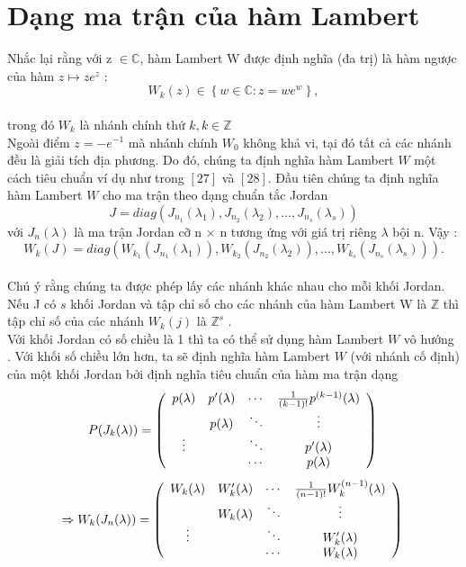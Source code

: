 \section{Dạng ma trận của hàm Lambert}
Nhắc lại rằng với z $\in \mathbb{C}$, hàm Lambert W được định nghĩa (đa trị) là hàm ngược của hàm $z \mapsto ze^{z}$ :
$$ W_k(z) \in \left\{w \in \mathbb{C} : z = we^{w}\right\}, $$ \\
trong đó $W_{k}$ là nhánh chính thứ $k, k \in \mathbb{Z}$ \\
Ngoài điểm $ z = -e^{-1}$ mà nhánh chính $W_0$ không khả vi, tại đó tất cả các nhánh đều là giải tích địa phương. Do đó, chúng ta định nghĩa hàm Lambert $W$ một cách tiêu chuẩn ví dụ như trong $[27]$ và $[28]$. Đầu tiên chúng ta định nghĩa hàm Lambert $W$ cho ma trận theo dạng chuẩn tắc Jordan
$$ J = diag (J_{n_{1}}(\lambda_{1}),J_{n_{2}}(\lambda_{2}),...,J_{n_{s}}(\lambda_{s})) $$
với $J_n(\lambda)$ là ma trận Jordan cỡ n $\times$ n tương ứng với giá trị riêng  $\lambda$ bội n.
Vậy :
$$ W_k(J) = diag (W_{k_{1}}(J_{n_{1}}(\lambda_{1})),W_{k_{2}}(J_{n_{2}}(\lambda_{2})),...,W_{k_{s}}(J_{n_{s}}(\lambda_{s}))).$$ \\
Chú ý rằng chúng ta được phép lấy các nhánh khác nhau cho mỗi khối Jordan. Nếu J có $s$ khối Jordan  và tập chỉ số cho các nhánh của hàm Lambert W là $\mathbb{Z}$ thì tập chỉ số của các nhánh $W_k(j)$ là $ \mathbb{Z}^{s} $  . \\
Với khối Jordan có số chiều là 1 thì ta có thể sử dụng hàm Lambert $W$ vô hướng . Với khối số chiều lớn hơn, ta sẽ định nghĩa hàm Lambert $W$ (với nhánh cố định) của một khối Jordan bởi định nghĩa tiêu chuẩn của hàm ma trận dạng
$$ P(J_k(\lambda)) = \left(
\begin{array}{cccc}
p(\lambda) & p'(\lambda) & \cdots & \frac{1}{(k-1)!}p^{(k-1)}(\lambda) \\
 & p(\lambda) & \ddots & \vdots \\
\vdots &  &\ddots & p'(\lambda) \\
 &  & \cdots & p(\lambda) \\
\end{array}
\right)
 \\ $$
$$ \Rightarrow W_k(J_n(\lambda)) =  \left(
\begin{array}{cccc}
W_k(\lambda) & W_k'(\lambda) & \cdots & \frac{1}{(n-1)!}W_{k}^{(n-1)}(\lambda) \\
 & W_k(\lambda) & \ddots & \vdots \\
\vdots &  &\ddots & W'_k(\lambda) \\
 &  & \cdots & W_k(\lambda) \\
\end{array}
\right) \\ $$
